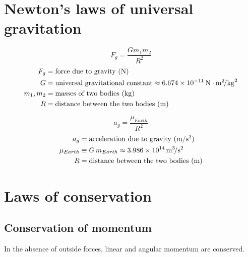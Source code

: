 \documentclass{article}
\begin{document}
\section{Newton's laws of universal gravitation}
\begin{multicols}{3}

	\begin{equation*}
	\boxed{F_{g} = \dfrac{Gm_{1}m_{2}}{R^{2}}}
	\end{equation*}
	\vfill\null
	\columnbreak
	\begin{align*}
	F_{g} &= \text{force due to gravity (\si{\newton})}\\
	G &= \text{universal gravitational constant} \approx
	  6.674 \times 10^{-11}\,\si{\newton \meter\squared\per\kilo\gram\squared}\\
	m_{1}, m_{2} &= \text{masses of two bodies  (\si{\kilo\gram})}\\
	R &= \text{distance between the two bodies  (\si{\meter})}\\
	\end{align*}
\end{multicols}
\begin{multicols}{3}
	\begin{equation*}
	\boxed{a_{g} = \dfrac{\mu_{Earth}}{R^{2}}}
	\end{equation*}
	\vfill\null
	\columnbreak
	\begin{align*}
	a_{g} &= \text{acceleration due to gravity (\si{\meter\per\second\squared})}\\
	\mu_{Earth} &\equiv G\,m_{Earth} \approx 3.986 \times 10^{14} \, \si{\meter\cubed\per\second\squared}\\
	R &= \text{distance between the two bodies  (\si{\meter})}\\
	\end{align*}

	\vfill\null
\end{multicols}

\section{Laws of conservation}
\subsection{Conservation of momentum}
In the absence of outside forces, linear and angular momentum are conserved.
\end{document}
